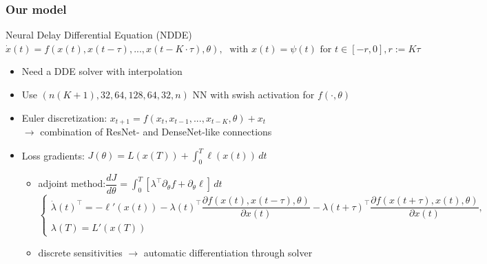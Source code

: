 \documentclass[11pt,aspectratio=169]{beamer}
\begin{document}
\begin{frame}[t]
    \frametitle{Our model}
        \begin{block}{Neural Delay Differential Equation (NDDE)}
        $\dot{x}(t) = f(x(t), x(t-\tau), ..., x(t-K\cdot\tau), \theta), \;\text{ with } x(t) = \psi(t) \text{ for } t\in [-r,0], r:=K\tau $
    \end{block}
    \begin{itemize}
        \item Need a DDE solver with interpolation
        \item Use $(n(K+1), 32, 64, 128, 64, 32, n)$ NN with swish activation for $f(\cdot,\theta)$
        \item Euler discretization:\; $x_{t+1} = f(x_t, x_{t-1},..., x_{t-K}, \theta) + x_t$\\
        $\to$ combination of ResNet- and DenseNet-like connections
        \item Loss gradients: $J(\theta) = L(x(T)) + \int_0^T \ell(x(t))\,dt$
        \begin{itemize}
            \item adjoint method:\quad $\dfrac{dJ}{d\theta} = \int_0^T \left[\lambda^\top\partial_\theta f+\partial_\theta \ell \right]\, dt$\\\vspace{0.1cm}
            $\begin{cases}\dot{\lambda}(t)^\top = -\ell'(x(t)) - \lambda(t)^\top \dfrac{\partial f(x(t),x(t-\tau),\theta)}{\partial x(t)} - \lambda(t+\tau)^\top \dfrac{\partial f(x(t+\tau),x(t),\theta)}{\partial x(t)},\\\lambda(T)=L'(x(T))\end{cases}$\vspace{0.1cm}
            \item discrete sensitivities $\to$ automatic differentiation through solver
        \end{itemize}
     \end{itemize}

\end{frame}

\end{document}
